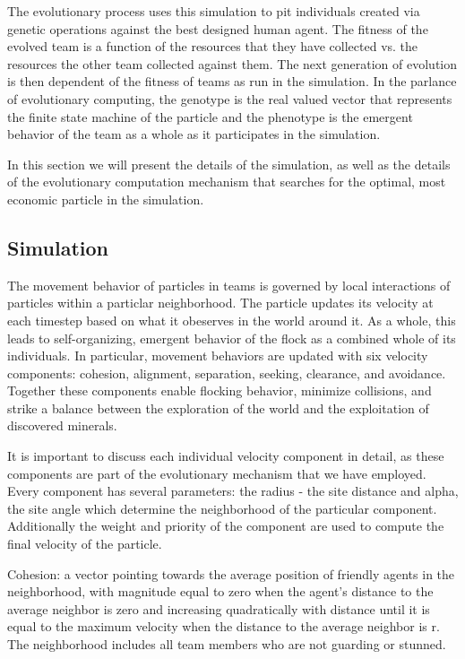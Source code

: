 \documentclass[12pt,journal,compsoc]{IEEEtran}
\begin{document}
The evolutionary process uses this simulation to pit individuals created via genetic operations against the best designed human agent. The fitness of the evolved team is a function of the resources that they have collected vs. the resources the other team collected against them. The next generation of evolution is then dependent of the fitness of teams as run in the simulation. In the parlance of evolutionary computing, the genotype is the real valued vector that represents the finite state machine of the particle and the phenotype is the emergent behavior of the team as a whole as it participates in the simulation.

In this section we will present the details of the simulation, as well as the details of the evolutionary computation mechanism that searches for the optimal, most economic particle in the simulation.

\subsection{Simulation}

The movement behavior of particles in teams is governed by local interactions of particles within a particlar neighborhood. The particle updates its velocity at each timestep based on what it obeserves in the world around it. As a whole, this leads to self-organizing, emergent behavior of the flock as a combined whole of its individuals. In particular, movement behaviors are updated with six velocity components: cohesion, alignment, separation, seeking, clearance, and avoidance. Together these components enable flocking behavior, minimize collisions, and strike a balance between the exploration of the world and the exploitation of discovered minerals.


It is important to discuss each individual velocity component in detail, as these components are part of the evolutionary mechanism that we have employed. Every component has several parameters: the radius - the site distance and alpha, the site angle which determine the neighborhood of the particular component. Additionally the weight and priority of the component are used to compute the final velocity of the particle.

Cohesion: a vector pointing towards the average position of friendly agents in the neighborhood, with magnitude equal to zero when the agent's distance to the average neighbor is zero and increasing quadratically with distance until it is equal to the maximum velocity when the distance to the average neighbor is r. The neighborhood includes all team members who are not guarding or stunned.
\end{document}

